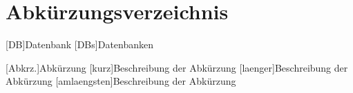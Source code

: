 
\chapter{Abkürzungsverzeichnis}

\begin{acronym}[amlaengsten]
    [DB]{Datenbank}
    [DBs]{Datenbanken}

    [Abkrz.]{Abkürzung}
    [kurz]{Beschreibung der Abkürzung}
    [laenger]{Beschreibung der Abkürzung}
    [amlaengsten]{Beschreibung der Abkürzung}
\end{acronym}
